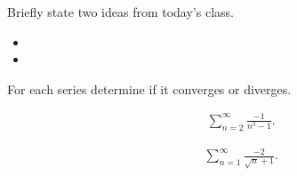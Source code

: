 \begin{problem}
\item Briefly state two ideas from today's class.
  \begin{itemize}
  \item
  \item
  \end{itemize}
\item
  \begin{subproblem}
    \item
  \end{subproblem}
\end{problem}


\begin{problem}
\item For each series determine if it converges or diverges.
  \begin{subproblem}
  \item
    \begin{eqnarray*}
      & & \sum^\infty_{n=2} \frac{-1}{n^3-1}.
    \end{eqnarray*}
    \vfill
  \item
    \begin{eqnarray*}
      & & \sum^\infty_{n=1} \frac{-2}{\sqrt{n}+1}.
    \end{eqnarray*}
    \vfill
  \end{subproblem}
\end{problem}


